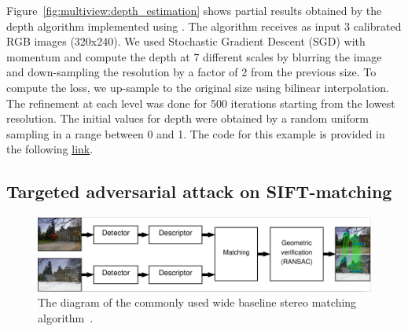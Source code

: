 Figure~\ref{fig:multiview:depth_estimation} shows partial results obtained by the depth algorithm implemented using \lib. The algorithm receives as input 3 calibrated RGB images (320x240). We used Stochastic Gradient Descent (SGD) with momentum and compute the depth at 7 different scales by blurring the image and down-sampling the resolution by a factor of 2 from the previous size. To compute the loss, we up-sample  to the original size using bilinear interpolation.  The refinement at each level was done for 500 iterations starting from the lowest resolution. The initial values for depth were obtained by a random uniform sampling in a range between 0 and 1. The code for this example is provided in the following \underline{\color{blue}\href{https://github.com/kornia/kornia-examples/blob/master/depth_estimation.ipynb}{link}}.

\subsection{Targeted adversarial attack on SIFT-matching}
\label{section:use_cases:adversarial_matching}

\begin{figure}[t]
    \begin{center}
        \includegraphics[width=\linewidth]{main/chapter03/data/wbs/wbs_scheme.jpg} 
    \end{center}
    \caption{The diagram of the commonly used wide baseline stereo matching algorithm~\citep{Pritchett1998}.}
    \label{fig:wbs-scheme}
\end{figure}

